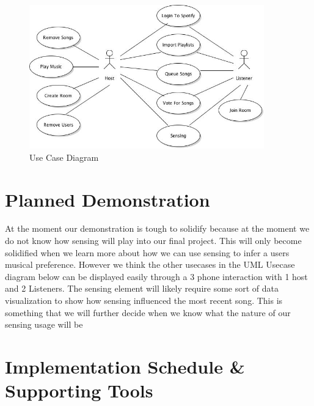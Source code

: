 \documentclass[12pt]{article}
\begin{document}
\begin{figure}[htb!]
  \centering
  \includegraphics[width=4in]{usecase-diagram}
  \caption {Use Case Diagram}
\end{figure}


\pagebreak

\section{Planned Demonstration}
\begin{enumerate}
At the moment our demonstration is tough to solidify because at the moment we do not know how sensing will play into our final project.  This will only become solidified when we learn more about how we can use sensing to infer a users musical preference. However we think the other usecases in the UML Usecase diagram below can be displayed easily through a 3 phone interaction with 1 host and 2 Listeners. The sensing element will likely require some sort of data visualization to show how sensing influenced the most recent song. This is something that we will further decide when we know what the nature of our sensing usage will be
\end{enumerate}
\pagebreak

\section{Implementation Schedule \& Supporting Tools}
\end{document}
